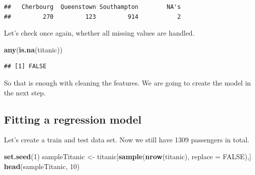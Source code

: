 \documentclass[12,]{article}
\newenvironment{Shaded}{\begin{snugshade}}{\end{snugshade}}
\newcommand{\KeywordTok}[1]{\textcolor[rgb]{0.13,0.29,0.53}{\textbf{#1}}}
\newcommand{\DataTypeTok}[1]{\textcolor[rgb]{0.13,0.29,0.53}{#1}}
\newcommand{\DecValTok}[1]{\textcolor[rgb]{0.00,0.00,0.81}{#1}}
\newcommand{\StringTok}[1]{\textcolor[rgb]{0.31,0.60,0.02}{#1}}
\newcommand{\OtherTok}[1]{\textcolor[rgb]{0.56,0.35,0.01}{#1}}
\newcommand{\OperatorTok}[1]{\textcolor[rgb]{0.81,0.36,0.00}{\textbf{#1}}}
\newcommand{\NormalTok}[1]{#1}
\begin{document}
\begin{Shaded}
\end{Shaded}

\begin{verbatim}
##   Cherbourg  Queenstown Southampton        NA's 
##         270         123         914           2
\end{verbatim}

\begin{Shaded}
\end{Shaded}

Let's check once again, whether all missing values are handled.

\begin{Shaded}
\begin{Highlighting}[]
\KeywordTok{any}\NormalTok{(}\KeywordTok{is.na}\NormalTok{(titanic))}
\end{Highlighting}
\end{Shaded}

\begin{verbatim}
## [1] FALSE
\end{verbatim}

So that is enough with cleaning the features. We are going to create the
model in the next step.

\subsection{Fitting a regression
model}\label{fitting-a-regression-model}

Let's create a train and test data set. Now we still have 1309
passengers in total.

\begin{Shaded}
\begin{Highlighting}[]
\KeywordTok{set.seed}\NormalTok{(}\DecValTok{1}\NormalTok{)}
\NormalTok{sampleTitanic <-}\StringTok{ }\NormalTok{titanic[}\KeywordTok{sample}\NormalTok{(}\KeywordTok{nrow}\NormalTok{(titanic), }\DataTypeTok{replace =} \OtherTok{FALSE}\NormalTok{),]}
\KeywordTok{head}\NormalTok{(sampleTitanic, }\DecValTok{10}\NormalTok{)}
\end{Highlighting}
\end{Shaded}
\end{document}
